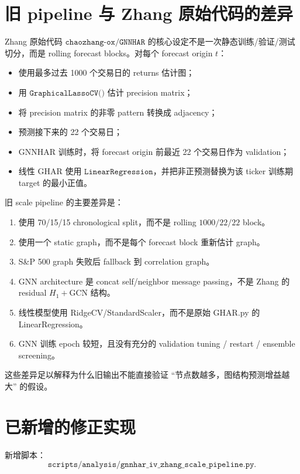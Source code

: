 \documentclass[11pt,a4paper]{ctexart}
\begin{document}
\section{旧 pipeline 与 Zhang 原始代码的差异}

Zhang 原始代码 \(\texttt{chaozhang-ox/GNNHAR}\) 的核心设定不是一次静态训练/验证/测试切分，而是 rolling forecast blocks。对每个 forecast origin \(t\)：
\begin{itemize}[leftmargin=*]
\item 使用最多过去 1000 个交易日的 returns 估计图；
\item 用 \(\texttt{GraphicalLassoCV()}\) 估计 precision matrix；
\item 将 precision matrix 的非零 pattern 转换成 adjacency；
\item 预测接下来的 22 个交易日；
\item GNNHAR 训练时，将 forecast origin 前最近 22 个交易日作为 validation；
\item 线性 GHAR 使用 \(\texttt{LinearRegression}\)，并把非正预测替换为该 ticker 训练期 target 的最小正值。
\end{itemize}

旧 scale pipeline 的主要差异是：
\begin{enumerate}[leftmargin=*]
\item 使用 70/15/15 chronological split，而不是 rolling \(1000/22/22\) block。
\item 使用一个 static graph，而不是每个 forecast block 重新估计 graph。
\item S\&P 500 graph 失败后 fallback 到 correlation graph。
\item GNN architecture 是 concat self/neighbor message passing，不是 Zhang 的 residual \(H_1+\mathrm{GCN}\) 结构。
\item 线性模型使用 RidgeCV/StandardScaler，而不是原始 GHAR.py 的 LinearRegression。
\item GNN 训练 epoch 较短，且没有充分的 validation tuning / restart / ensemble screening。
\end{enumerate}

这些差异足以解释为什么旧输出不能直接验证 ``节点数越多，图结构预测增益越大'' 的假设。

\section{已新增的修正实现}

新增脚本：
\[
\texttt{scripts/analysis/gnnhar\_iv\_zhang\_scale\_pipeline.py}.
\]
\end{document}

